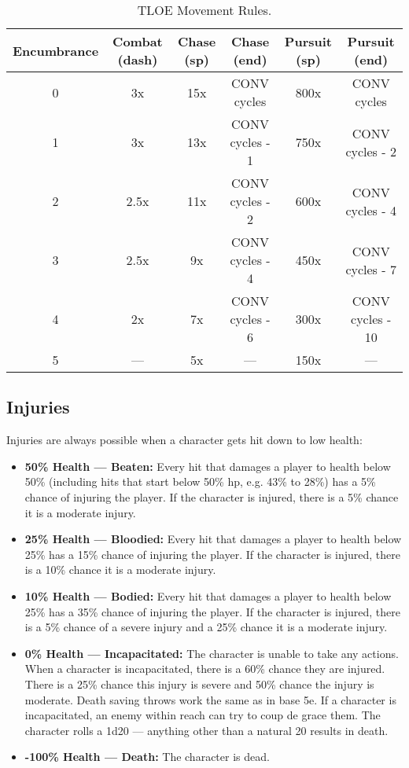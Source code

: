 \documentclass[letterpaper,12pt]{article}
\begin{document}
\begin{table}[ht]
\begin{center}
\caption{TLOE Movement Rules.}
\label{tbl:bins} %
\begin{tabular}{|c|c|cc|cc|} 
\hline
\multicolumn{1}{|c|}{Encumbrance} & \multicolumn{0}{|c|}{Combat (dash)} & \multicolumn{0}{|c}{Chase (sp)} & \multicolumn{0}{c|}{Chase (end)} & \multicolumn{0}{|c}{Pursuit (sp)} & \multicolumn{1}{c|}{Pursuit (end)} \\
\hline
0 &   3x &   15x &   CONV cycles &   800x &   CONV cycles \\
1 &   3x &   13x &   CONV cycles - 1 &   750x &   CONV cycles - 2\\
2 &   2.5x &   11x &   CONV cycles - 2 &   600x &   CONV cycles - 4\\
3 &   2.5x &   9x &   CONV cycles - 4 &   450x &   CONV cycles - 7\\
4 &   2x &   7x &   CONV cycles - 6 &  300x  &   CONV cycles - 10\\
5 &   --- &   5x &   --- &   150x &   --- \\
\hline
\end{tabular}
\end{center}
\end{table}



\subsection{Injuries}
 
Injuries are always possible when a character gets hit down to low health:

\begin{itemize}
\item \textbf{50\% Health --- Beaten:} Every hit that damages a player to health below 50\% (including hits that start below 50\% hp, e.g. 43\% to 28\%) has a 5\% chance of injuring the player. If the character is injured, there is a 5\% chance it is a moderate injury. 
\item \textbf{25\% Health --- Bloodied:} Every hit that damages a player to health below 25\% has a 15\% chance of injuring the player. If the character is injured, there is a 10\% chance it is a moderate injury. 
\item \textbf{10\% Health --- Bodied:} Every hit that damages a player to health below 25\% has a 35\% chance of injuring the player. If the character is injured, there is a 5\% chance of a severe injury and a 25\% chance it is a moderate injury. 
\item \textbf{0\% Health --- Incapacitated:} The character is unable to take any actions. When a character is incapacitated, there is a 60\% chance they are injured. There is a 25\% chance this injury is severe and 50\% chance the injury is moderate. Death saving throws work the same as in base 5e. If a character is incapacitated, an enemy within reach can try to coup de grace them. The character rolls a 1d20 --- anything other than a natural 20 results in death.
\item \textbf{-100\% Health --- Death:} The character is dead. 
\end{itemize}  
\end{document}
